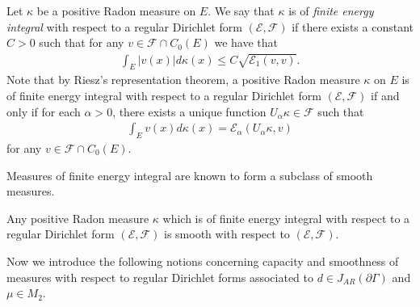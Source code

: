\documentclass[AHL,Unicode,longabstracts,published]{cedram}
\newcommand{\ce}{\mathcal{E}}
\newcommand{\cf}{\mathcal{F}}
\begin{document}
\begin{defi}
Let $\kappa$ be a positive Radon measure on $E$. We say that $\kappa$ is of \emph{finite energy integral} with respect to a regular Dirichlet form $(\ce,\cf)$ if there exists a constant $C>0$ such that for any $v\in\cf\cap C_0(E)$ we have that
\begin{align*}
\int_E|v(x)|d\kappa(x)\leq C\sqrt{\ce_1(v,v)}.
\end{align*}
Note that by Riesz's representation theorem, a positive Radon measure $\kappa$ on $E$ is of finite energy integral with respect to a regular Dirichlet form $(\ce,\cf)$ if and only if for each $\alpha>0$, there exists a unique function $U_{\alpha}\kappa\in \cf$ such that
\begin{align*}
\int_Ev(x)d\kappa(x)=\ce_{\alpha}(U_{\alpha}\kappa,v)
\end{align*}
for any $v\in\cf\cap C_0(E)$.
\end{defi}
Measures of finite energy integral are known to form a subclass of smooth measures.

\begin{prop}
Any positive Radon measure $\kappa$ which is of finite energy integral with respect to a regular Dirichlet form $(\ce,\cf)$ is smooth with respect to $(\ce,\cf)$.
\end{prop}

Now we introduce the following notions concerning capacity and smoothness of measures with respect to regular Dirichlet forms associated to $d\in J_{AR}(\partial\Gamma)$ and $\mu\in M_2$.
\end{document}

